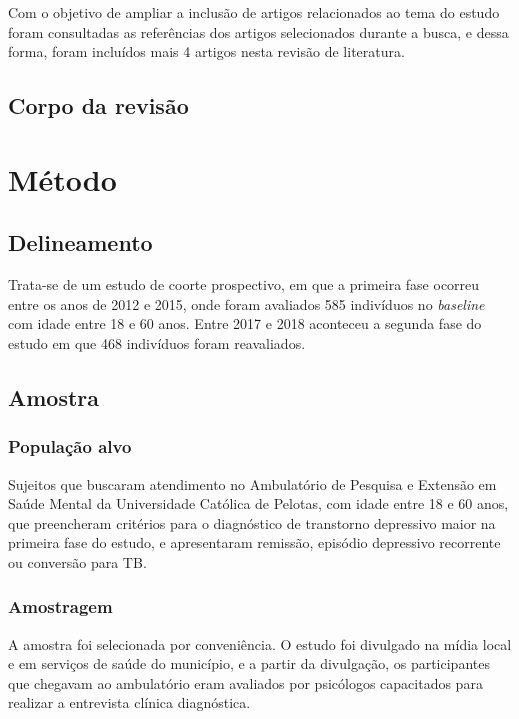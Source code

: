 \documentclass[chapter=TITLE,oneside,12pt,a4paper,english,brazil]{abntex2} %
\begin{document}
    Com o objetivo de ampliar a inclusão de artigos relacionados ao tema do estudo
    foram consultadas as referências dos artigos selecionados durante a busca, e
    dessa forma, foram incluídos mais 4 artigos nesta revisão de literatura.

    \section{Corpo da revisão}\label{sec:corporevisao}

\vspace{\onelineskip}
\chapter{Método}\label{sec:metodo}

\section{Delineamento}\label{sec:delineamento}

    Trata-se de um estudo de coorte prospectivo, em que a primeira fase ocorreu
    entre os anos de 2012 e 2015, onde foram avaliados 585 indivíduos no
    \textit{baseline} com idade entre 18 e 60 anos.
    Entre 2017 e 2018 aconteceu a segunda fase do estudo em que 468 indivíduos
    foram reavaliados.

\section{Amostra}\label{sec:sujeitos}

    \subsection{População alvo}

    Sujeitos que buscaram atendimento no Ambulatório de Pesquisa e Extensão
    em Saúde Mental da Universidade Católica de Pelotas, com idade entre 18
    e 60 anos, que preencheram critérios para o diagnóstico de transtorno
    depressivo maior na primeira fase do estudo, e apresentaram remissão,
    episódio depressivo recorrente ou conversão para TB.

   \subsection{Amostragem} 
    
    A amostra foi selecionada por conveniência. O estudo foi divulgado na mídia
    local e em serviços de saúde do município, e a partir da divulgação,
    os participantes que chegavam ao ambulatório eram avaliados por psicólogos
    capacitados para realizar a entrevista clínica diagnóstica.
\end{document}
